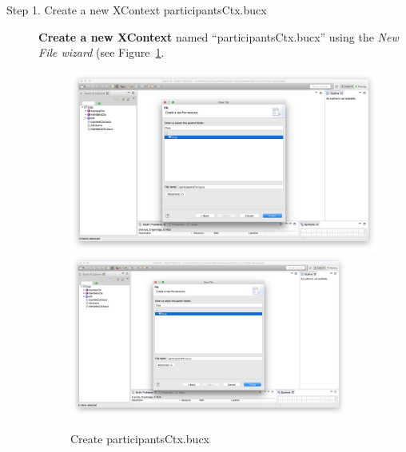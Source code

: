 \begin{description}
\item[Step 1. Create a new XContext participantsCtx.bucx] \textbf{Create a new XContext} named ``participantsCtx.bucx'' using the \emph{New File wizard} (see Figure~\ref{fig:CreateParticipantsCtx}.
  \begin{figure}[!htbp]
    \centering
    \ifplastex
    \includegraphics[width=512]{figures/CreateParticipantsCtx}
    \else
    \includegraphics[width=0.9\textwidth]{figures/CreateParticipantsCtx}
    \fi
    \caption{Create participantsCtx.bucx}
    \label{fig:CreateParticipantsCtx}
  \end{figure}


\end{description}
